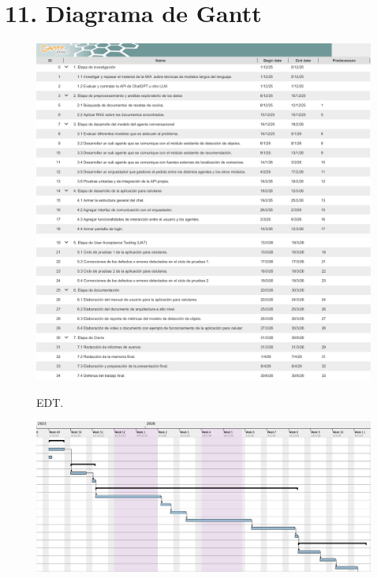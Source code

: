 \documentclass[
11pt, %
]{charter}
\begin{document}
\section{11. Diagrama de Gantt}
\label{sec:gantt}

\begin{figure}[H]
\centering 
\includegraphics[width=1\textwidth]{./Figuras/gantt_1_1.png}\\[0.5em]
\includegraphics[width=1\textwidth]{./Figuras/gantt_1_2.png}
\caption{EDT.}
\label{fig:AoN}
\end{figure}

\newpage
\begin{landscape}
\begin{figure}[H]
\centering 
\includegraphics[width=1.55\textwidth]{./Figuras/gantt_2_1.png}
\label{fig:AoN}
\end{figure}
\end{landscape}
\end{document}
